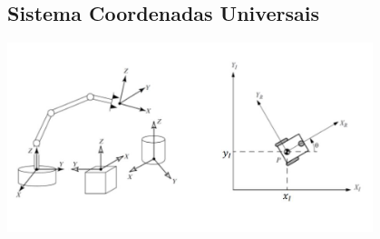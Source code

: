 \documentclass[t]{beamer}
\begin{document}
\subsection{Sistema Coordenadas Universais}
\begin{frame}[c]
	\begin{center}
		\includegraphics[width=0.8\textwidth]{images/mecanismos.jpg}
	\end{center}
\end{frame}
\end{document}
